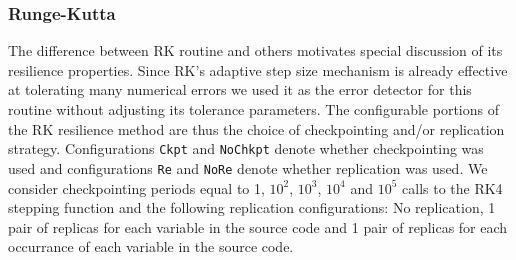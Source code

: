 \documentclass{sig-alternate}
\newcommand{\sui}[1]{%
  \textcolor{green}{SC - #1}
}
\newcommand{\greg}[1]{%
  \textcolor{blue}{GB: #1}
}
\begin{document}






\subsubsection{Runge-Kutta}
\label{sec:res_tech:eval:rk}

The difference between RK routine and others motivates special discussion of its resilience properties.
Since RK's adaptive step size mechanism is already effective at tolerating many numerical errors we used it as the error detector for this routine without adjusting its tolerance parameters.
The configurable portions of the RK resilience method are thus the choice of checkpointing and/or replication strategy.
Configurations \texttt{Ckpt} and \texttt{NoChkpt} denote whether checkpointing was used and configurations \texttt{Re} and \texttt{NoRe} denote whether replication was used.
We consider checkpointing periods equal to 1, $10^2$, $10^3$, $10^4$ and $10^5$ calls to the RK4 stepping function and the following replication configurations: No replication, 1 pair of replicas for each variable in the source code and 1 pair of replicas for each occurrance of each variable in the source code.
\end{document}
